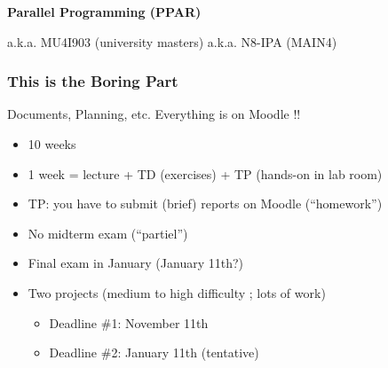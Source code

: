 \documentclass[10pt]{beamer}
\subtitle{Organisation}
\author[C. Bouillaguet]{\textbf{Charles Bouillaguet / Vincent Neiger}}
\institute[SU]{Sorbonne Université}
\date{PPAR}
\begin{document}

\begin{frame}
  
  \centering

  
  \vspace{1cm}
  
  \textbf{\Large Parallel Programming (PPAR)}

  \bigskip

  a.k.a. MU4I903 (university masters) a.k.a. N8-IPA (MAIN4)
\end{frame}


\begin{frame}
  \frametitle{This is the Boring Part}

  \begin{block}{Documents, Planning, etc.}
    Everything is on Moodle !!
  \end{block}
  
  \begin{itemize}
  \item 10 weeks
  \item 1 week = lecture + TD (exercises) + TP (hands-on in lab room)
  \item TP: you have to submit (brief) reports on Moodle (``homework'')
  \item No midterm exam (``partiel'')
  \item Final exam in January (January 11th?)
  \item Two projects (medium to high difficulty ; lots of work)
    \begin{itemize}
    \item Deadline \#1: November 11th
    \item Deadline \#2: January 11th (tentative)
    \end{itemize}
  \end{itemize}
\end{frame}

\end{document}
